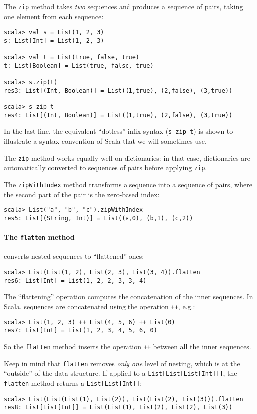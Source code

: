The \lstinline!zip! method takes \emph{two} sequences and produces
a sequence of pairs, taking one element from each sequence:
\begin{lstlisting}
scala> val s = List(1, 2, 3)
s: List[Int] = List(1, 2, 3)

scala> val t = List(true, false, true)
t: List[Boolean] = List(true, false, true)

scala> s.zip(t)
res3: List[(Int, Boolean)] = List((1,true), (2,false), (3,true))

scala> s zip t
res4: List[(Int, Boolean)] = List((1,true), (2,false), (3,true)) 
\end{lstlisting}
In the last line, the equivalent \textsf{``}dotless\textsf{''} infix syntax (\lstinline!s zip t!)
is shown to illustrate a syntax convention of Scala that we will sometimes
use.

The \lstinline!zip! method works equally well on dictionaries: in
that case, dictionaries are automatically converted to sequences of
pairs before applying \lstinline!zip!.

The \lstinline!zipWithIndex! method transforms a sequence into a
sequence of pairs, where the second part of the pair is the zero-based
index:
\begin{lstlisting}
scala> List("a", "b", "c").zipWithIndex
res5: List[(String, Int)] = List((a,0), (b,1), (c,2)) 
\end{lstlisting}


\paragraph*{The \texttt{flatten} method}

converts nested sequences to \textsf{``}flattened\textsf{''} ones:
\begin{lstlisting}
scala> List(List(1, 2), List(2, 3), List(3, 4)).flatten
res6: List[Int] = List(1, 2, 2, 3, 3, 4)
\end{lstlisting}
The \textsf{``}flattening\textsf{''} operation computes the concatenation of the inner
sequences. In Scala, sequences are concatenated using the operation
\lstinline!++!, e.g.:
\begin{lstlisting}
scala> List(1, 2, 3) ++ List(4, 5, 6) ++ List(0)
res7: List[Int] = List(1, 2, 3, 4, 5, 6, 0)
\end{lstlisting}
So the \lstinline!flatten! method inserts the operation \lstinline!++!
between all the inner sequences.

Keep in mind that \lstinline!flatten! removes \emph{only one} level
of nesting, which is at the \textsf{``}outside\textsf{''} of the data structure. If
applied to a \lstinline!List[List[List[Int]]]!, the \lstinline!flatten!
method returns a \lstinline!List[List[Int]]!:
\begin{lstlisting}
scala> List(List(List(1), List(2)), List(List(2), List(3))).flatten
res8: List[List[Int]] = List(List(1), List(2), List(2), List(3))
\end{lstlisting}


